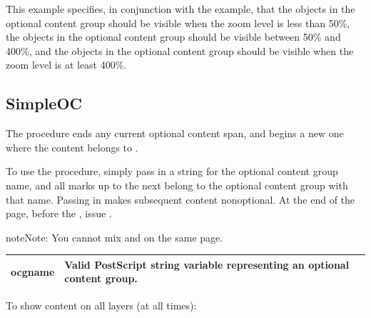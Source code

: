 \documentclass[letterpaper,12pt,english,openany,oneside]{sphinxmanual}
\begin{document}
This example specifies, in conjunction with the  example, that the objects in the  optional content group should be visible when the zoom level is less than 50\%, the objects in the  optional content group should be visible between 50\% and 400\%, and the objects in the  optional content group should be visible when the zoom level is at least 400\%.


\subsection{SimpleOC}
\label{\detokenize{pdfmark_OC_Interface:simpleoc}}
The  procedure ends any current optional content span, and begins a new one where the content belongs to  .

To use the  procedure, simply pass in a string for the optional content group name, and all marks up to the next  belong to the optional content group with that name. Passing in  makes subsequent content non\sphinxhyphen{}optional. At the end of the page, before the  , issue  .

\begin{sphinxadmonition}{note}{Note:}
You cannot mix  and  on the same page.
\end{sphinxadmonition}
\label{\detokenize{pdfmark_OC_Interface:syntax-8}}

\begin{sphinxVerbatim}[commandchars=\\\{\}]
 
\end{sphinxVerbatim}
\label{\detokenize{pdfmark_OC_Interface:parameters-6}}


\begin{savenotes}\sphinxattablestart
\centering
{}\label{\detokenize{pdfmark_OC_Interface:section-6}}\nobreak
\begin{tabulary}{\linewidth}[t]{|T|T|}
\hline

ocgname
&
Valid PostScript string variable representing an optional content group.
\\
\hline
\end{tabulary}
\par
\sphinxattableend\end{savenotes}
\label{\detokenize{pdfmark_OC_Interface:example-3}}

To show content on all layers (at all times):

\begin{sphinxVerbatim}[commandchars=\\\{\}]
 
\end{sphinxVerbatim}



\renewcommand{\indexname}{Index}
\printindex
\end{document}
